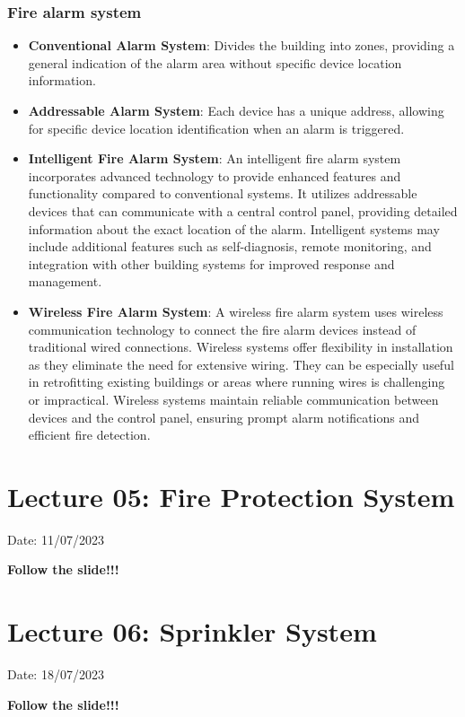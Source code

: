 \documentclass{article}
\begin{document}
\subsubsection*{Fire alarm system} 
\begin{itemize}
  \item \textbf{Conventional Alarm System}: Divides the building into zones, providing a general indication of the alarm area without specific device location information.

  \item \textbf{Addressable Alarm System}: Each device has a unique address, allowing for specific device location identification when an alarm is triggered.

  \item \textbf{Intelligent Fire Alarm System}: An intelligent fire alarm system incorporates advanced technology to provide enhanced features and functionality compared to conventional systems. It utilizes addressable devices that can communicate with a central control panel, providing detailed information about the exact location of the alarm. Intelligent systems may include additional features such as self-diagnosis, remote monitoring, and integration with other building systems for improved response and management.

  \item \textbf{Wireless Fire Alarm System}: A wireless fire alarm system uses wireless communication technology to connect the fire alarm devices instead of traditional wired connections. Wireless systems offer flexibility in installation as they eliminate the need for extensive wiring. They can be especially useful in retrofitting existing buildings or areas where running wires is challenging or impractical. Wireless systems maintain reliable communication between devices and the control panel, ensuring prompt alarm notifications and efficient fire detection.
\end{itemize}

\section{Lecture 05: Fire Protection System} 
\hfill Date: 11/07/2023

\textbf{Follow the slide!!!}
\vspace*{1cm}

\section{Lecture 06: Sprinkler System} 
\hfill Date: 18/07/2023

\textbf{Follow the slide!!!}
\vspace*{1cm}
\end{document}
